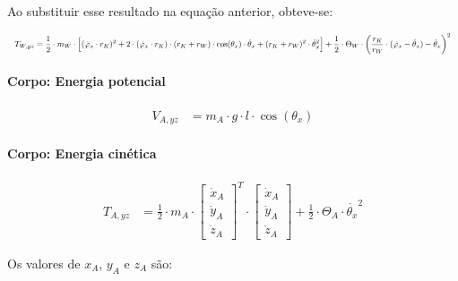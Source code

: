 Ao substituir esse resultado na equação anterior, obteve-se:

\begin{equation*}
    \scalebox{0.65}{$
        \begin{aligned}
            T_{W,yz} = \frac{1}{2} \cdot m_W \cdot \Big[ (\dot{\varphi}_x \cdot r_K)^2 + 2 \cdot (\dot{\varphi}_x \cdot r_K) \cdot (r_K + r_W) \cdot \cos(\theta_x) \cdot \dot{\theta}_x + (r_K + r_W)^2 \cdot \dot{\theta}_x^2 \Big] + \frac{1}{2} \cdot \Theta_W \cdot \bigg(\frac{r_K}{r_W} \cdot (\dot{\varphi}_x - \dot{\theta}_x) - \dot{\theta}_x \bigg)^2
        \end{aligned}
    $}
\end{equation*}


\paragraph{Corpo: Energia potencial}

\begin{equation*}
    \begin{aligned}
        V_{A,yz} & = m_A \cdot g \cdot l \cdot \cos{(\theta_x)}
    \end{aligned}
\end{equation*}

\paragraph{Corpo: Energia cinética}

\begin{equation*}
    \begin{aligned}
        T_{A,yz} & = \frac{1}{2} \cdot m_A \cdot 
        \begin{bmatrix}
            \dot x_A \\
            \dot y_A \\
            \dot z_A
        \end{bmatrix}^T
        \cdot
        \begin{bmatrix}
            \dot x_A \\
            \dot y_A \\
            \dot z_A
        \end{bmatrix}
        +
        \frac{1}{2} \cdot \Theta_A \cdot \dot {\theta_x}^2
    \end{aligned}
\end{equation*}

Os valores de $x_A$, $y_A$ e $z_A$ são:

